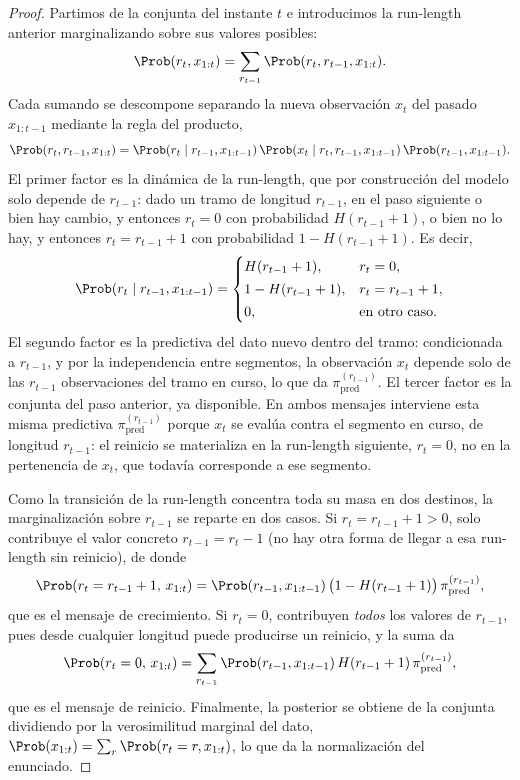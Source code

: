\begin{proof}
Partimos de la conjunta del instante $t$ e introducimos la run-length anterior marginalizando sobre sus valores posibles:
\[
\Prob(r_t, x_{1:t}) = \sum_{r_{t-1}} \Prob(r_t, r_{t-1}, x_{1:t}).
\]
Cada sumando se descompone separando la nueva observación $x_t$ del pasado $x_{1:t-1}$ mediante la regla del producto,
\[
\Prob(r_t, r_{t-1}, x_{1:t})
= \Prob(r_t \mid r_{t-1}, x_{1:t-1})\,
  \Prob(x_t \mid r_t, r_{t-1}, x_{1:t-1})\,
  \Prob(r_{t-1}, x_{1:t-1}).
\]
El primer factor es la dinámica de la run-length, que por construcción del modelo solo depende de $r_{t-1}$: dado un tramo de longitud $r_{t-1}$, en el paso siguiente o bien hay cambio, y entonces $r_t = 0$ con probabilidad $H(r_{t-1}+1)$, o bien no lo hay, y entonces $r_t = r_{t-1}+1$ con probabilidad $1 - H(r_{t-1}+1)$. Es decir,
\[
\Prob(r_t \mid r_{t-1}, x_{1:t-1}) =
\begin{cases}
H(r_{t-1}+1), & r_t = 0,\\[2pt]
1 - H(r_{t-1}+1), & r_t = r_{t-1}+1,\\[2pt]
0, & \text{en otro caso.}
\end{cases}
\]
El segundo factor es la predictiva del dato nuevo dentro del tramo: condicionada a $r_{t-1}$, y por la independencia entre segmentos, la observación $x_t$ depende solo de las $r_{t-1}$ observaciones del tramo en curso, lo que da $\pi^{(r_{t-1})}_{\mathrm{pred}}$. El tercer factor es la conjunta del paso anterior, ya disponible. En ambos mensajes interviene esta misma predictiva $\pi^{(r_{t-1})}_{\mathrm{pred}}$ porque $x_t$ se evalúa contra el segmento en curso, de longitud $r_{t-1}$: el reinicio se materializa en la run-length siguiente, $r_t = 0$, no en la pertenencia de $x_t$, que todavía corresponde a ese segmento.

Como la transición de la run-length concentra toda su masa en dos destinos, la marginalización sobre $r_{t-1}$ se reparte en dos casos. Si $r_t = r_{t-1} + 1 > 0$, solo contribuye el valor concreto $r_{t-1} = r_t - 1$ (no hay otra forma de llegar a esa run-length sin reinicio), de donde
\[
\Prob(r_t = r_{t-1}+1,\, x_{1:t})
= \Prob(r_{t-1}, x_{1:t-1})\,\big(1 - H(r_{t-1}+1)\big)\,\pi^{(r_{t-1})}_{\mathrm{pred}},
\]
que es el mensaje de crecimiento. Si $r_t = 0$, contribuyen \emph{todos} los valores de $r_{t-1}$, pues desde cualquier longitud puede producirse un reinicio, y la suma da
\[
\Prob(r_t = 0,\, x_{1:t})
= \sum_{r_{t-1}} \Prob(r_{t-1}, x_{1:t-1})\, H(r_{t-1}+1)\, \pi^{(r_{t-1})}_{\mathrm{pred}},
\]
que es el mensaje de reinicio. Finalmente, la posterior se obtiene de la conjunta dividiendo por la verosimilitud marginal del dato, $\Prob(x_{1:t}) = \sum_{r}\Prob(r_t = r, x_{1:t})$, lo que da la normalización del enunciado.
\end{proof}

